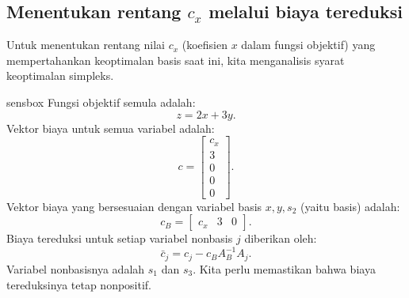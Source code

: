 \subsection{Menentukan rentang \( c_x \) melalui biaya tereduksi}

Untuk menentukan rentang nilai \( c_x \) (koefisien \( x \) dalam fungsi objektif) yang mempertahankan keoptimalan basis saat ini, kita menganalisis syarat keoptimalan simpleks.

\begin{steppanel}{sensbox}
Fungsi objektif semula adalah:
\[
    z = 2x + 3y.
\]
Vektor biaya untuk semua variabel adalah:
\[
    c = \begin{bmatrix} c_x \\ 3 \\ 0 \\ 0 \\ 0 \end{bmatrix}.
\]
Vektor biaya yang bersesuaian dengan variabel basis \( x, y, s_2 \) (yaitu basis) adalah:
\[
    c_B = \begin{bmatrix} c_x & 3 & 0 \end{bmatrix}.
\]
Biaya tereduksi untuk setiap variabel nonbasis \( j \) diberikan oleh:
\[
    \bar{c}_j = c_j - c_B A_B^{-1} A_j.
\]
Variabel nonbasisnya adalah \( s_1 \) dan \( s_3 \). Kita perlu memastikan bahwa biaya tereduksinya tetap nonpositif.
\end{steppanel}

